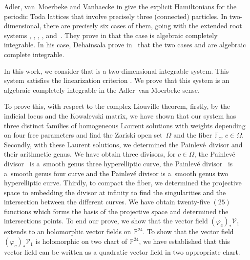 \documentclass[pdftex]{sigma}
\numberwithin{equation}{section}
\begin{document}
 Adler, van~Moerbeke and Vanhaecke in \cite{al_Moer3} give the explicit
Hamiltonians for the periodic Toda lattices that involve precisely
three (connected) particles. In two-dimensional, there are precisely six cases of them, going with the extended root systems
, ,
, ,
 and~. They prove in \cite{al_Moer5,al_Moer3}
that the case  is algebraic completely integrable. In his case, Dehainsala prove in~\cite{Dehainsala} that the two cases  and  are algebraic complete integrable.

In this work, we consider that  is a
two-dimensional integrable system. This system satisfies the
linearization criterion \cite[Theorem 6.41]{al_Moer3}. We prove
that this system is an algebraic completely integrable in the
Adler--van Moerbeke sense.

To prove this, with respect to the complex Liouville theorem,
firstly, by the indicial locus and the Kowalevski matrix, we have
shown that our system has three distinct families of homogeneous
Laurent solutions with weights depending on four free parameters and
find the Zariski open set~$\Omega$ and the fiber $\mathbb{F}_c$,
$c \in \Omega$. Secondly, with these Laurent solutions, we determined
the Painlev\'{e}~divisor and their arithmetic genus. We have obtain
three divisors, for $c \in \Omega$, the Painlev\'e divisor~ is a~smooth genus three hyperelliptic
curve, the Painlev\'e divisor~ is a~smooth genus four curve and the Painlev\'e divisor
 is a~smooth genus two hyperelliptic
curve. Thirdly, to compact the fiber, we determined the projective
space to embedding the divisor at infinity to find the singularities
and the intersection between the different curves. We have obtain
twenty-five $(25)$ functions which forms the basis of the
projective space and determined the intersections points. To end our
prove, we show that the vector field
$(\varphi_c)_{\ast}\mathcal{V}_1$ extends to an
holomorphic vector fields on $\mathbb{P}^{24}$. To show that the
vector field $(\varphi_c)_{\ast}\mathcal{V}_1$ is
holomorphic on two chart of $\mathbb{P}^{24}$, we have established
that this vector field can be written as a quadratic vector field in
two appropriate chart.
\end{document}
